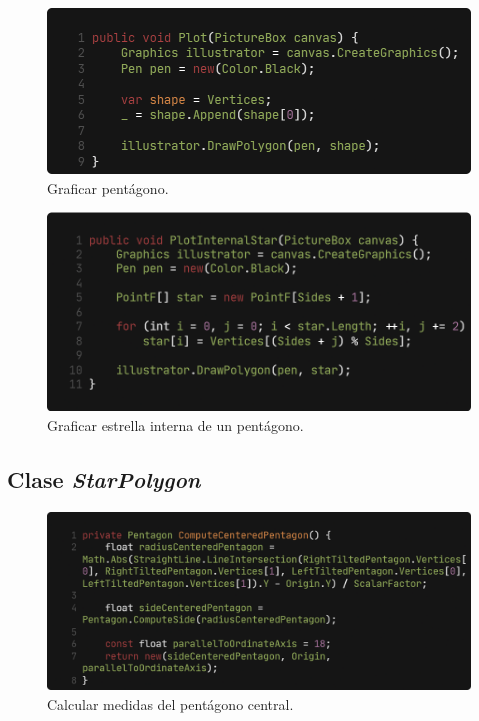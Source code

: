 \documentclass[oneside, a4paper]{article}
\begin{document}
            \begin{figure}[H]
                \centering
                \includegraphics[width=\textwidth]{plot_pentagon.png}
                \caption{Graficar pentágono.}
                \label{fig:plot_pentagon}
            \end{figure}

            \begin{figure}[H]
                \centering
                \includegraphics[width=\textwidth]{plot_internal_star.png}
                \caption{Graficar estrella interna de un pentágono.}
                \label{fig:plot_internal_star}
            \end{figure}

        \subsection{Clase \textit{StarPolygon}}

            \begin{figure}[H]
                \centering
                \includegraphics[width=\textwidth]{compute_centered_pentagon.png}
                \caption{Calcular medidas del pentágono central.}
                \label{fig:compute_centered_pentagon}
            \end{figure}
\end{document}
